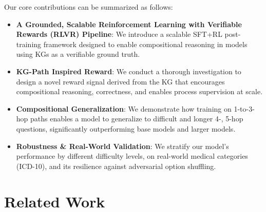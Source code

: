 \documentclass{article}
\theoremstyle{plain}
\theoremstyle{definition}
\theoremstyle{remark}
\begin{document}
Our core contributions can be summarized as follows:
\begin{itemize}
    \item \textbf{A Grounded, Scalable Reinforcement Learning with Verifiable Rewards (RLVR) Pipeline}: We introduce a scalable SFT+RL post-training framework designed to enable compositional reasoning in models using KGs as a verifiable ground truth.
    \item \textbf{KG-Path Inspired Reward}: We conduct a thorough investigation to design a novel reward signal derived from the KG that encourages compositional reasoning, correctness, and enables process supervision at scale.
    \item \textbf{Compositional Generalization}: We demonstrate how training on 1-to-3-hop paths enables a model to generalize to difficult and longer 4-, 5-hop questions, significantly outperforming base models and larger models.
    \item \textbf{Robustness \& Real-World Validation}: We stratify our model's performance by different difficulty levels, on real-world medical categories (ICD-10), and its resilience against adversarial option shuffling. 
\end{itemize}






\section{Related Work}

\end{document}
